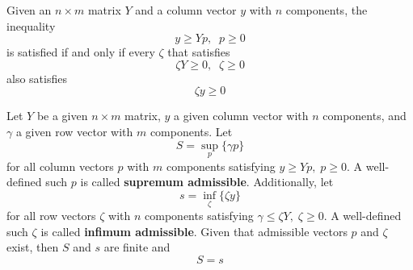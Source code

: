   \begin{theorem}
    Given an $n \times m$ matrix $Y$ and a column vector $y$ with $n$ components, the inequality 
    \begin{equation}
      y \geq Y p, \;\; p \geq 0
    \end{equation}
    is satisfied if and only if every $\zeta$ that satisfies
    \begin{equation}
      \zeta Y \geq 0, \;\; \zeta \geq 0
    \end{equation}
    also satisfies 
    \begin{equation}
      \zeta y \geq 0
    \end{equation}
  \end{theorem}

  \begin{theorem}
    Let $Y$ be a given $n \times m$ matrix, $y$ a given column vector with $n$ components, and $\gamma$ a given row vector with $m$ components. Let 
    \begin{equation}
      S = \sup_p \{\gamma p\}
    \end{equation}
    for all column vectors $p$ with $m$ components satisfying $y \geq Y p, \; p \geq 0$. A well-defined such $p$ is called \textbf{supremum admissible}. Additionally, let 
    \begin{equation}
      s = \inf_\zeta \{ \zeta y\}
    \end{equation}
    for all row vectors $\zeta$ with $n$ components satisfying $\gamma \leq \zeta Y, \; \zeta \geq 0$. A well-defined such $\zeta$ is called \textbf{infimum admissible}. Given that admissible vectors $p$ and $\zeta$ exist, then $S$ and $s$ are finite and 
    \begin{equation}
      S = s
    \end{equation}
  \end{theorem}

